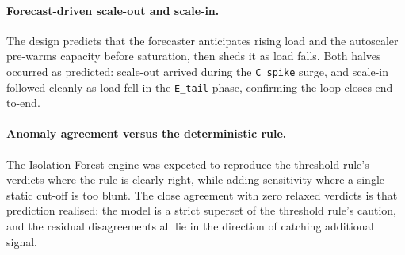 \paragraph{Forecast-driven scale-out and scale-in.} The design predicts that the
forecaster anticipates rising load and the autoscaler pre-warms capacity before
saturation, then sheds it as load falls. Both halves occurred as predicted: scale-out
arrived during the \texttt{C\_spike} surge, and scale-in followed cleanly as load fell
in the \texttt{E\_tail} phase, confirming the loop closes end-to-end.

\paragraph{Anomaly agreement versus the deterministic rule.} The Isolation Forest
engine was expected to reproduce the threshold rule's verdicts where the rule is
clearly right, while adding sensitivity where a single static cut-off is too blunt.
The close agreement with zero relaxed verdicts is that prediction realised: the
model is a strict superset of the threshold rule's caution, and the residual
disagreements all lie in the direction of catching additional signal.

